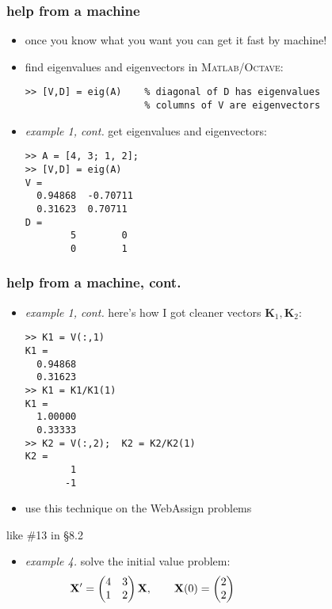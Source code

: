 \documentclass[urlcolor=blue,dvipsnames]{beamer}
\newcommand{\bK}{\mathbf{K}}
\newcommand{\bX}{\mathbf{X}}
\newcommand{\Matlab}{\textsc{Matlab}\xspace}
\newcommand{\Octave}{\textsc{Octave}\xspace}
\begin{document}
\begin{frame}[fragile]
\frametitle{help from a machine}

\begin{itemize}
\item \alert{once you know what you want you can get it fast by machine!}
\item find eigenvalues and eigenvectors in \Matlab/\Octave:
\begin{Verbatim}[fontsize=\small]
>> [V,D] = eig(A)    % diagonal of D has eigenvalues
                     % columns of V are eigenvectors
\end{Verbatim}

\bigskip
\item \emph{example 1, cont.}  get eigenvalues and eigenvectors:
\begin{Verbatim}[fontsize=\small]
>> A = [4, 3; 1, 2];
>> [V,D] = eig(A)
V =
  0.94868  -0.70711
  0.31623  0.70711
D =
        5        0
        0        1
\end{Verbatim}
\end{itemize}
\end{frame}


\begin{frame}[fragile]
\frametitle{help from a machine, cont.}

\begin{itemize}
\item \emph{example 1, cont.}  here's how I got cleaner vectors $\bK_1,\bK_2$:
\begin{Verbatim}[fontsize=\footnotesize]
>> K1 = V(:,1)
K1 =
  0.94868
  0.31623
>> K1 = K1/K1(1)
K1 =
  1.00000
  0.33333
>> K2 = V(:,2);  K2 = K2/K2(1)
K2 =
        1
       -1
\end{Verbatim}

\bigskip
\item use this technique on the WebAssign problems
\end{itemize}
\end{frame}


\begin{frame}{like \#13 in \S8.2}

\begin{itemize}
\item \emph{example 4.}  solve the initial value problem:
$$\bX' = \begin{pmatrix} 4 & 3 \\ 1 & 2 \end{pmatrix} \bX, \qquad \bX(0) = \begin{pmatrix} 2 \\ 2 \end{pmatrix} \hspace{40mm}$$
\end{itemize}

\vspace{70mm}
\end{frame}
\end{document}
